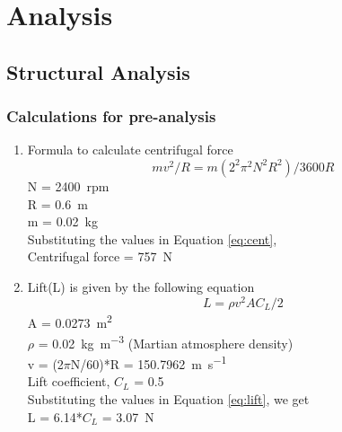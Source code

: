 \documentclass[preprint,12pt]{elsarticle}
\begin{document}
\section{Analysis}
\label{S:3}

\subsection{\textbf{Structural Analysis}}
\subsubsection{\textbf{Calculations for pre-analysis}}

\begin{enumerate}
\item Formula to calculate centrifugal force 
\begin{equation}
    mv^2/R = m(2^2\pi^2N^2R^2)/3600R
    \label{eq:cent}
\end{equation}
N = \SI{2400}{rpm}\\
R = \SI{0.6}{\metre}\\
m = \SI{0.02}{\kilogram}\\
Substituting the values in Equation \ref{eq:cent},\\
Centrifugal force = \SI{757}{\newton}\\

\item Lift(L) is given by the following equation\\
 \begin{equation}
    L = \rho v^2AC_L /2
    \label{eq:lift}
\end{equation}
A = \SI{0.0273}{\metre\squared}\\
$\rho$ = \SI{0.02}{\kilogram\per\metre\cubed} (Martian atmosphere density)\\
v = (2$\pi$N/60)*R = \SI{150.7962}{\metre\per\second}\\
Lift coefficient, $C_L$ = 0.5\\
Substituting the values in Equation \ref{eq:lift}, we get\\
L = 6.14*$C_L$ = \SI{3.07}{\newton}
\end{enumerate}
\end{document}
